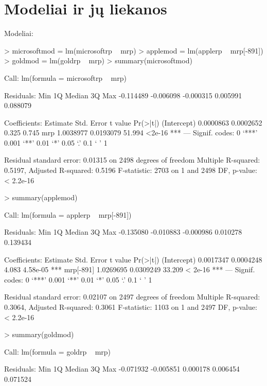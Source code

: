 \documentclass[12pt, a14paper, lithuanian]{article}
\begin{document}
\section{Modeliai ir jų liekanos}
\label{B 1}
Modeliai:
\begin{Schunk}
\begin{Sinput}
> microsoftmod = lm(microsoftrp ~ mrp)
> applemod = lm(applerp ~ mrp[-891])
> goldmod = lm(goldrp ~ mrp)
> summary(microsoftmod)
\end{Sinput}
\begin{Soutput}
Call:
lm(formula = microsoftrp ~ mrp)

Residuals:
      Min        1Q    Median        3Q       Max 
-0.114489 -0.006098 -0.000315  0.005991  0.088079 

Coefficients:
             Estimate Std. Error t value Pr(>|t|)    
(Intercept) 0.0000863  0.0002652   0.325    0.745    
mrp         1.0038977  0.0193079  51.994   <2e-16 ***
---
Signif. codes:  0 ‘***’ 0.001 ‘**’ 0.01 ‘*’ 0.05 ‘.’ 0.1 ‘ ’ 1 

Residual standard error: 0.01315 on 2498 degrees of freedom
Multiple R-squared: 0.5197,	Adjusted R-squared: 0.5196 
F-statistic:  2703 on 1 and 2498 DF,  p-value: < 2.2e-16 
\end{Soutput}
\begin{Sinput}
> summary(applemod)
\end{Sinput}
\begin{Soutput}
Call:
lm(formula = applerp ~ mrp[-891])

Residuals:
      Min        1Q    Median        3Q       Max 
-0.135080 -0.010883 -0.000986  0.010278  0.139434 

Coefficients:
             Estimate Std. Error t value Pr(>|t|)    
(Intercept) 0.0017347  0.0004248   4.083 4.58e-05 ***
mrp[-891]   1.0269695  0.0309249  33.209  < 2e-16 ***
---
Signif. codes:  0 ‘***’ 0.001 ‘**’ 0.01 ‘*’ 0.05 ‘.’ 0.1 ‘ ’ 1 

Residual standard error: 0.02107 on 2497 degrees of freedom
Multiple R-squared: 0.3064,	Adjusted R-squared: 0.3061 
F-statistic:  1103 on 1 and 2497 DF,  p-value: < 2.2e-16 
\end{Soutput}
\begin{Sinput}
> summary(goldmod)
\end{Sinput}
\begin{Soutput}
Call:
lm(formula = goldrp ~ mrp)

Residuals:
      Min        1Q    Median        3Q       Max 
-0.071932 -0.005851  0.000178  0.006454  0.071524 


\end{Soutput}
\end{Schunk}
\end{document}
